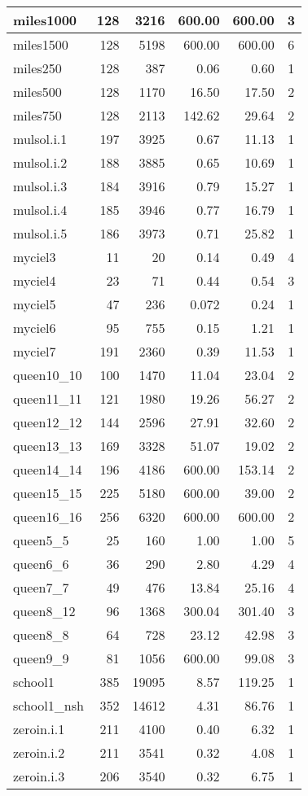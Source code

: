 \begin{table}[H]
\begin{tabular}{|l|r|r|r|r|c|}
miles1000 & 128 & 3216 & 600.00 & 600.00 & 3 \\ \hline
miles1500 & 128 & 5198 & 600.00 & 600.00 & 6 \\ \hline
miles250 & 128 & 387 & 0.06 & 0.60 & 1 \\ \hline
miles500 & 128 & 1170 & 16.50 & 17.50 & 2 \\ \hline
miles750 & 128 & 2113 & 142.62 & 29.64 & 2 \\ \hline
mulsol.i.1 & 197 & 3925 & 0.67 & 11.13 & 1 \\ \hline
mulsol.i.2 & 188 & 3885 & 0.65 & 10.69 & 1 \\ \hline
mulsol.i.3 & 184 & 3916 & 0.79 & 15.27 & 1 \\ \hline
mulsol.i.4 & 185 & 3946 & 0.77 & 16.79 & 1 \\ \hline
mulsol.i.5 & 186 & 3973 & 0.71 & 25.82 & 1 \\ \hline
myciel3 & 11 & 20 & 0.14 & 0.49 & 4 \\ \hline
myciel4 & 23 & 71 & 0.44 & 0.54 & 3 \\ \hline
myciel5 & 47 & 236 & 0.072 & 0.24 & 1 \\ \hline
myciel6 & 95 & 755 & 0.15 & 1.21 & 1 \\ \hline
myciel7 & 191 & 2360 & 0.39 & 11.53 & 1 \\ \hline
queen10\_10 & 100 & 1470 & 11.04 & 23.04 & 2 \\ \hline
queen11\_11 & 121 & 1980 & 19.26 & 56.27 & 2 \\ \hline
queen12\_12 & 144 & 2596 & 27.91 & 32.60 & 2 \\ \hline
queen13\_13 & 169 & 3328 & 51.07 & 19.02 & 2 \\ \hline
queen14\_14 & 196 & 4186 & 600.00 & 153.14 & 2 \\ \hline
queen15\_15 & 225 & 5180 & 600.00 & 39.00 & 2 \\ \hline
queen16\_16 & 256 & 6320 & 600.00 & 600.00 & 2 \\ \hline
queen5\_5 & 25 & 160 & 1.00 & 1.00 & 5 \\ \hline
queen6\_6 & 36 & 290 & 2.80 & 4.29 & 4 \\ \hline
queen7\_7 & 49 & 476 & 13.84 & 25.16 & 4 \\ \hline
queen8\_12 & 96 & 1368 & 300.04 & 301.40 & 3 \\ \hline
queen8\_8 & 64 & 728 & 23.12 & 42.98 & 3 \\ \hline
queen9\_9 & 81 & 1056 & 600.00 & 99.08 & 3 \\ \hline
school1 & 385 & 19095 & 8.57 & 119.25 & 1 \\ \hline
school1\_nsh & 352 & 14612 & 4.31 & 86.76  & 1 \\ \hline
zeroin.i.1 & 211 & 4100 & 0.40 & 6.32 & 1 \\ \hline
zeroin.i.2 & 211 & 3541 & 0.32 & 4.08 & 1 \\ \hline
zeroin.i.3 & 206 & 3540 & 0.32 & 6.75 & 1 \\ \hline
\end{tabular}
\end{table}

